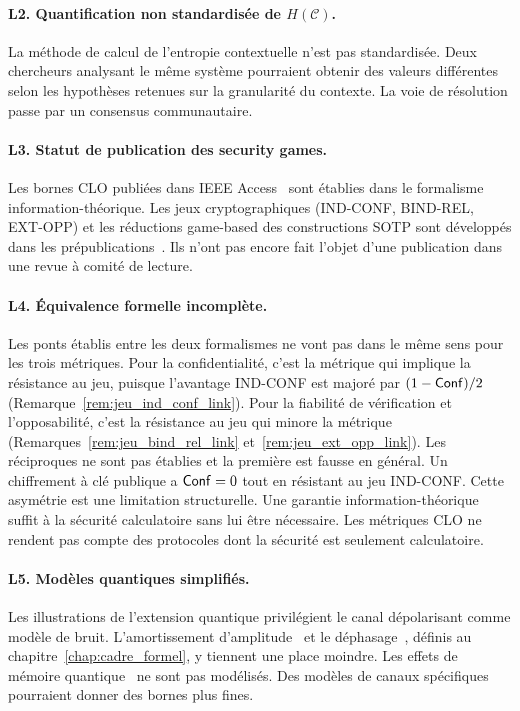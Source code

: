 \begin{sloppypar}
\paragraph{L2. Quantification non standardis\'ee de $H(\mathcal{C})$.}
La m\'ethode de calcul de l'entropie contextuelle n'est pas
standardis\'ee. Deux chercheurs analysant le m\^eme syst\`eme pourraient
obtenir des valeurs diff\'erentes selon les hypoth\`eses retenues sur
la granularit\'e du contexte. La voie de r\'esolution passe par un
consensus communautaire.

\paragraph{L3. Statut de publication des security games.}
Les bornes CLO publi\'ees dans IEEE Access~\cite{MINKA2026CLO,MINKA2026CRO,MINKA2026PQCRO}
sont \'etablies dans le formalisme information-th\'eorique. Les jeux
cryptographiques (IND-CONF, BIND-REL, EXT-OPP) et les r\'eductions
game-based des constructions SOTP sont d\'evelopp\'es dans les
pr\'epublications~\cite{MINKA2025CRO,MINKA2025Q2CSI,MINKA2025ZKNR_UC}.
Ils n'ont pas encore fait l'objet d'une publication dans une revue
\`a comit\'e de lecture.

\paragraph{L4. \'Equivalence formelle incompl\`ete.}
Les ponts \'etablis entre les deux formalismes ne vont pas dans le m\^eme sens
pour les trois m\'etriques. Pour la confidentialit\'e, c'est la m\'etrique qui
implique la r\'esistance au jeu, puisque l'avantage IND-CONF est major\'e par
$(1-\mathsf{Conf})/2$ (Remarque~\ref{rem:jeu_ind_conf_link}). Pour la fiabilit\'e de
v\'erification et l'opposabilit\'e, c'est la r\'esistance au jeu qui minore la
m\'etrique (Remarques~\ref{rem:jeu_bind_rel_link} et~\ref{rem:jeu_ext_opp_link}).
Les r\'eciproques ne sont pas \'etablies et la premi\`ere est fausse en g\'en\'eral. Un
chiffrement \`a cl\'e publique a $\mathsf{Conf} = 0$ tout en r\'esistant au jeu IND-CONF. Cette
asym\'etrie est une limitation structurelle. Une garantie information-th\'eorique
suffit \`a la s\'ecurit\'e calculatoire sans lui \^etre n\'ecessaire. Les
m\'etriques CLO ne rendent pas compte des protocoles dont la s\'ecurit\'e est seulement
calculatoire.

\paragraph{L5. Mod\`eles quantiques simplifi\'es.}
Les illustrations de l'extension quantique privil\'egient le canal d\'epolarisant
comme mod\`ele de bruit. L'amortissement
d'amplitude~\cite{Devoret2013} et le d\'ephasage~\cite{Breuer2002}, d\'efinis au
chapitre~\ref{chap:cadre_formel}, y tiennent une place moindre. Les effets de
m\'emoire quantique~\cite{Rivas2012} ne sont pas mod\'elis\'es. Des mod\`eles de canaux sp\'ecifiques pourraient donner des
bornes plus fines.


\end{sloppypar}
